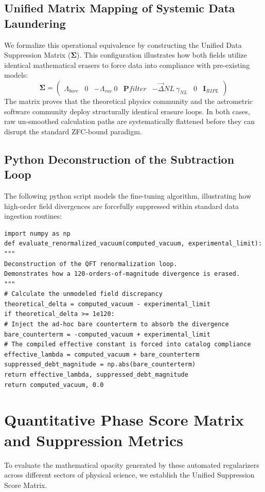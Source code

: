 \documentclass[11pt,a4paper]{article}
\theoremstyle{plain}
\theoremstyle{definition}
\begin{document}
\subsection{Unified Matrix Mapping of Systemic Data Laundering}
We formalize this operational equivalence by constructing the Unified Data Suppression Matrix ($\mathbf{\Sigma}$). This configuration illustrates how both fields utilize identical mathematical erasers to force data into compliance with pre-existing models:
\begin{equation}
\mathbf{\Sigma} = \begin{pmatrix}
\Lambda_{bare} & 0 & -\Lambda_{vac} \
0 & \mathbf{P}{filter} & -\vec{\Delta}{NL} \
\gamma_{NL} & 0 & \mathbf{I}_{RIPL}
\end{pmatrix}
\end{equation}
The matrix proves that the theoretical physics community and the astrometric software community deploy structurally identical erasure loops. In both cases, raw un-smoothed calculation paths are systematically flattened before they can disrupt the standard ZFC-bound paradigm.
\subsection{Python Deconstruction of the Subtraction Loop}
The following python script models the fine-tuning algorithm, illustrating how high-order field divergences are forcefully suppressed within standard data ingestion routines:
\begin{verbatim}
import numpy as np
def evaluate_renormalized_vacuum(computed_vacuum, experimental_limit):
"""
Deconstruction of the QFT renormalization loop.
Demonstrates how a 120-orders-of-magnitude divergence is erased.
"""
# Calculate the unmodeled field discrepancy
theoretical_delta = computed_vacuum - experimental_limit
if theoretical_delta >= 1e120:
# Inject the ad-hoc bare counterterm to absorb the divergence
bare_counterterm = -computed_vacuum + experimental_limit
# The compiled effective constant is forced into catalog compliance
effective_lambda = computed_vacuum + bare_counterterm
suppressed_debt_magnitude = np.abs(bare_counterterm)
return effective_lambda, suppressed_debt_magnitude
return computed_vacuum, 0.0
\end{verbatim}
\newpage
\section{Quantitative Phase Score Matrix and Suppression Metrics}
To evaluate the mathematical opacity generated by these automated regularizers across different sectors of physical science, we establish the Unified Suppression Score Matrix.
\end{document}
